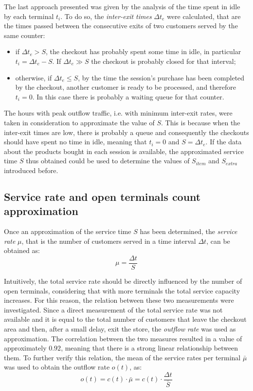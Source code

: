 The last approach presented was given by the analysis of the time spent in idle by each terminal \( t_i \). To do so, the \emph{inter-exit times} \( \Delta t_e \) were calculated, that are the times passed between the consecutive exits of two customers served by the same counter:
\begin{itemize}
  \item if \( \Delta t_e > S \), the checkout has probably spent some time in idle, in particular \( t_i = \Delta t_e - S \). If \( \Delta t_e \gg S \) the checkout is probably closed for that interval;
  \item otherwise, if \( \Delta t_e \le S \), by the time the session’s purchase has been completed by the checkout, another customer is ready to be processed, and therefore \( t_i = 0 \). In this case there is probably a waiting queue for that counter.
\end{itemize}

The hours with peak outflow traffic, i.e. with minimum inter-exit rates, were taken in consideration to approximate the value of \( S \). This is because when the inter-exit times are low, there is probably a queue and consequently the checkouts should have spent no time in idle, meaning that \( t_i = 0 \) and \( S = \Delta t_e \). If the data about the products bought in each session is available, the approximated service time \( S \) thus obtained could be used to determine the values of \( S_{item} \) and \( S_{extra} \) introduced before.

\subsection{Service rate and open terminals count approximation}
\label{subsec:service_rate_and_open_terminals_count_approximation}

Once an approximation of the service time \( S \) has been determined, the \emph{service rate} \( \mu \), that is the number of customers served in a time interval \( \Delta t \), can be obtained as:
\begin{equation}
  \mu = \frac{\Delta t}{S}
  \label{eq:service_rate}
\end{equation}

Intuitively, the total service rate should be directly influenced by the number of open terminals, considering that with more terminals the total service capacity increases. For this reason, the relation between these two measurements were investigated. Since a direct measurement of the total service rate was not available and it is equal to the total number of customers that leave the checkout area and then, after a small delay, exit the store, the \emph{outflow rate} was used as approximation. The correlation between the two measures resulted in a value of approximately \( 0.92 \), meaning that there is a strong linear relationship between them. To further verify this relation, the mean of the service rates per terminal \( \bar{\mu} \) was used to obtain the outflow rate \( o(t) \), as:
\begin{equation}
  o(t) = c(t) \cdot \bar{\mu} = c(t) \cdot \frac{\Delta t}{\bar{S}}
\end{equation}

